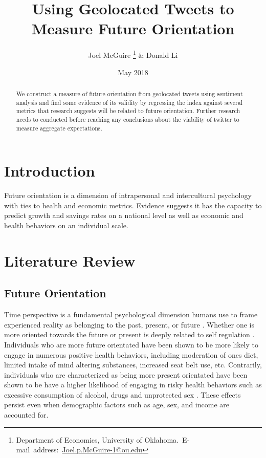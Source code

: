 \documentclass{article}
\title{Using Geolocated Tweets to Measure Future Orientation}
\author{Joel McGuire \thanks{Department of Economics, University of Oklahoma.\
E-mail~address:~\href{mailto:
joel.p.mcguire-1@ou.edu}{Joel.p.McGuire-1@ou.edu}} & Donald Li }
\date{May 2018}
\begin{document}
\maketitle



\begin{abstract}
\begin{singlespace}
We construct a measure of future orientation from geolocated tweets using sentiment analysis and find some evidence of its validity by regressing the index against several metrics that research suggests will be related to future orientation. Further research needs to conducted before reaching any conclusions about the viability of twitter to measure aggregate expectations. 
\end{singlespace}

\end{abstract}
\vfill{}


\pagebreak{}


\section{Introduction}
Future orientation is a dimension of intrapersonal and intercultural psychology with ties to health and economic metrics. Evidence suggests it has the capacity to predict growth and savings rates on a national level as well as economic and health behaviors on an individual scale.

\section{Literature Review}

\subsection{Future Orientation}


Time perspective is a fundamental psychological dimension humans use to frame experienced reality as belonging to the past, present, or future \citep{zimbardo2015putting}. Whether one is more oriented towards the future or present is deeply related to self regulation \citep{howlett2008role}. Individuals who are more future orientated have been shown to be more likely to engage in numerous positive health behaviors, including moderation of ones diet, limited intake of mind altering substances, increased seat belt use, etc. Contrarily, individuals who are characterized as being more present orientated have been shown to be have a higher likelihood of engaging in risky health behaviors such as excessive consumption of alcohol, drugs and unprotected sex \citep{henson2006associations, daugherty2010taking}. These effects persist even when demographic factors such as age, sex, and income are accounted for. 
\end{document}
